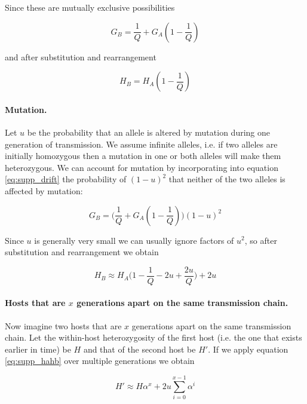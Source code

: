 \documentclass[_main.tex]{subfiles}
\begin{document}
\noindent Since these are mutually exclusive possibilities

\begin{equation}
G_B = \frac{1}{Q} + G_A (1- \frac{1}{Q})
\label{eq:supp_drift}
\end{equation}

\noindent and after substitution and rearrangement

\begin{equation*}
H_B = H_A (1- \frac{1}{Q})
\end{equation*}

\paragraph{Mutation.}  Let $u$ be the probability that an allele is altered by mutation during one generation of transmission.  We assume infinite alleles, i.e. if two alleles are initially homozygous then a mutation in one or both alleles will make them heterozygous.  We can account for mutation by incorporating into equation \ref{eq:supp_drift} the probability of $(1-u)^2$ that neither of the two alleles is affected by mutation:

\begin{equation*}
G_B = \Big( \frac{1}{Q} + G_A (1- \frac{1}{Q}) \Big) (1-u)^2
\label{eq:supp_drift_mut}
\end{equation*}

Since $u$ is generally very small we can usually ignore factors of $u^2$, so after substitution and rearrangement we obtain

\begin{equation}
H_B \approx H_A \Big(1 - \frac{1}{Q} - 2u + \frac{2u}{Q} \Big) + 2u
\label{eq:supp_hahb}
\end{equation}

\paragraph{Hosts that are $x$ generations apart on the same transmission chain.}  Now imagine two hosts that are $x$ generations apart on the same transmission chain.  Let the within-host heterozygosity of the first host (i.e. the one that exists earlier in time) be $H$ and that of the second host be $H'$.  If we apply equation \ref{eq:supp_hahb} over multiple generations we obtain

\begin{equation}
H' \approx H \alpha^x + 2u \sum_{i=0}^{x-1} \alpha^i
\label{eq:supp_alpha_decay}
\end{equation}
\end{document}

